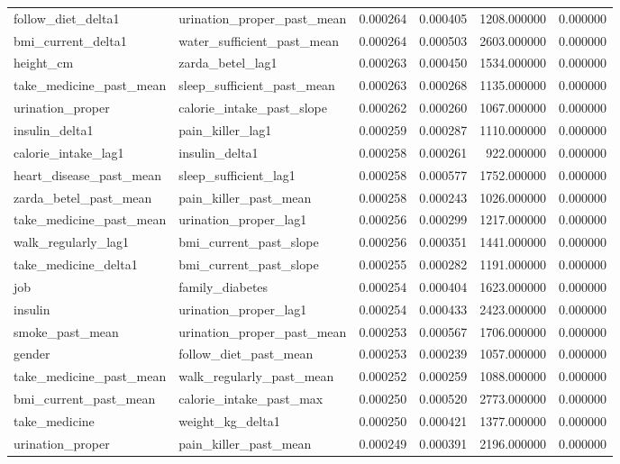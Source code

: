 \begin{longtable}{llrrrr}
follow\_diet\_delta1 & urination\_proper\_past\_mean & 0.000264 & 0.000405 & 1208.000000 & 0.000000 \\
bmi\_current\_delta1 & water\_sufficient\_past\_mean & 0.000264 & 0.000503 & 2603.000000 & 0.000000 \\
height\_cm & zarda\_betel\_lag1 & 0.000263 & 0.000450 & 1534.000000 & 0.000000 \\
take\_medicine\_past\_mean & sleep\_sufficient\_past\_mean & 0.000263 & 0.000268 & 1135.000000 & 0.000000 \\
urination\_proper & calorie\_intake\_past\_slope & 0.000262 & 0.000260 & 1067.000000 & 0.000000 \\
insulin\_delta1 & pain\_killer\_lag1 & 0.000259 & 0.000287 & 1110.000000 & 0.000000 \\
calorie\_intake\_lag1 & insulin\_delta1 & 0.000258 & 0.000261 & 922.000000 & 0.000000 \\
heart\_disease\_past\_mean & sleep\_sufficient\_lag1 & 0.000258 & 0.000577 & 1752.000000 & 0.000000 \\
zarda\_betel\_past\_mean & pain\_killer\_past\_mean & 0.000258 & 0.000243 & 1026.000000 & 0.000000 \\
take\_medicine\_past\_mean & urination\_proper\_lag1 & 0.000256 & 0.000299 & 1217.000000 & 0.000000 \\
walk\_regularly\_lag1 & bmi\_current\_past\_slope & 0.000256 & 0.000351 & 1441.000000 & 0.000000 \\
take\_medicine\_delta1 & bmi\_current\_past\_slope & 0.000255 & 0.000282 & 1191.000000 & 0.000000 \\
job & family\_diabetes & 0.000254 & 0.000404 & 1623.000000 & 0.000000 \\
insulin & urination\_proper\_lag1 & 0.000254 & 0.000433 & 2423.000000 & 0.000000 \\
smoke\_past\_mean & urination\_proper\_past\_mean & 0.000253 & 0.000567 & 1706.000000 & 0.000000 \\
gender & follow\_diet\_past\_mean & 0.000253 & 0.000239 & 1057.000000 & 0.000000 \\
take\_medicine\_past\_mean & walk\_regularly\_past\_mean & 0.000252 & 0.000259 & 1088.000000 & 0.000000 \\
bmi\_current\_past\_mean & calorie\_intake\_past\_max & 0.000250 & 0.000520 & 2773.000000 & 0.000000 \\
take\_medicine & weight\_kg\_delta1 & 0.000250 & 0.000421 & 1377.000000 & 0.000000 \\
urination\_proper & pain\_killer\_past\_mean & 0.000249 & 0.000391 & 2196.000000 & 0.000000 \\

\end{longtable}
